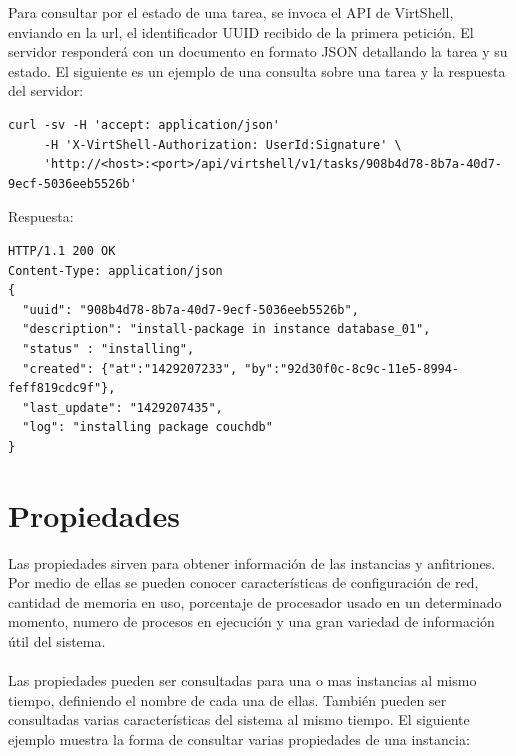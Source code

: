 Para consultar por el estado de una tarea, se invoca el API de VirtShell, enviando en la url, el identificador UUID recibido de la primera petición. El servidor responderá con un documento en formato JSON detallando la tarea y su estado. El siguiente es un ejemplo de una consulta sobre una tarea y la respuesta del servidor:

\vspace{3cm}

\begin{lstlisting}[style=json, caption=Ejemplo de consulta de una tarea]
curl -sv -H 'accept: application/json' 
     -H 'X-VirtShell-Authorization: UserId:Signature' \ 
     'http://<host>:<port>/api/virtshell/v1/tasks/908b4d78-8b7a-40d7-9ecf-5036eeb5526b'
\end{lstlisting}

\vspace{5mm}

Respuesta:

\vspace{5mm}


\begin{lstlisting}[style=json, caption=Ejemplo del detalle de una tarea]
HTTP/1.1 200 OK
Content-Type: application/json
{
  "uuid": "908b4d78-8b7a-40d7-9ecf-5036eeb5526b",
  "description": "install-package in instance database_01",
  "status" : "installing",
  "created": {"at":"1429207233", "by":"92d30f0c-8c9c-11e5-8994-feff819cdc9f"},
  "last_update": "1429207435",
  "log": "installing package couchdb"
}
\end{lstlisting}


\section{Propiedades}
Las propiedades sirven para obtener información de las instancias y anfitriones. Por medio de ellas se pueden conocer características de configuración de red, cantidad de memoria en uso, porcentaje de procesador usado en un determinado momento, numero de procesos en ejecución y una gran variedad de información útil del sistema.\\
\\
Las propiedades pueden ser consultadas para una o mas instancias al mismo tiempo, definiendo el nombre de cada una de ellas. También pueden ser consultadas varias características del sistema al mismo tiempo. El siguiente ejemplo muestra la forma de consultar varias propiedades de una instancia:

\vspace{5mm}



